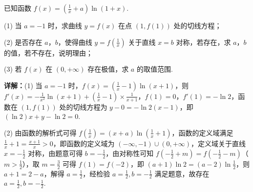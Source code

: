 \begin{question}[points=12]
已知函数 $f(x)=(\frac{1}{x}+a)\ln(1+x)$.



(1) 当 $a=-1$ 时，求曲线 $y=f(x)$ 在点 $(1,f(1))$ 处的切线方程；



(2) 是否存在 $a$，$b$，使得曲线 $y=f(\frac{1}{x})$ 关于直线 $x=b$ 对称，若存在，求 $a$，$b$ 的值，若不存在，说明理由；



(3) 若 $f(x)$ 在 $(0,+\infty)$ 存在极值，求 $a$ 的取值范围.
\begin{solution}

\textbf{详解：}(1) 当 $a=-1$ 时，$f(x)=(\frac{1}{x}-1)\ln(x+1)$，则 $f'(x)=-\frac{1}{x^2}\ln(x+1)+(\frac{1}{x}-1)\times\frac{1}{x+1}$，$f(1)=0$，$f'(1)=-\ln2$，函数在 $(1,f(1))$ 处的切线方程为 $y-0=-\ln2(x-1)$，即 $(\ln2)x+y-\ln2=0$.

(2) 由函数的解析式可得 $f(\frac{1}{x})=(x+a)\ln(\frac{1}{x}+1)$，函数的定义域满足 $\frac{1}{x}+1=\frac{x+1}{x}>0$，即函数的定义域为 $(-\infty,-1)\cup(0,+\infty)$，定义域关于直线 $x=-\frac{1}{2}$ 对称，由题意可得 $b=-\frac{1}{2}$，由对称性可知 $f(-\frac{1}{2}+m)=f(-\frac{1}{2}-m)$（$m>\frac{1}{2}$），取 $m=\frac{3}{2}$ 可得 $f(1)=f(-2)$，即 $(a+1)\ln2=(a-2)\ln\frac{1}{2}$，则 $a+1=2-a$，解得 $a=\frac{1}{2}$，经检验 $a=\frac{1}{2},b=-\frac{1}{2}$ 满足题意，故存在 $a=\frac{1}{2},b=-\frac{1}{2}$.


\end{solution}
\end{question}
